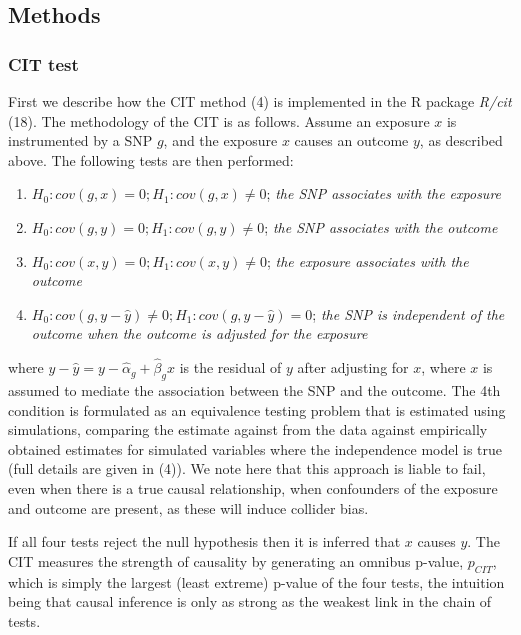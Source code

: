 \documentclass[]{article}
\providecommand{\tightlist}{%
  \setlength{\itemsep}{0pt}\setlength{\parskip}{0pt}}
\begin{document}
\subsection{Methods}\label{methods}

\subsubsection{CIT test}\label{cit-test}

First we describe how the CIT method (4) is implemented in the R package
\emph{R/cit} (18). The methodology of the CIT is as follows. Assume an
exposure \(x\) is instrumented by a SNP \(g\), and the exposure \(x\)
causes an outcome \(y\), as described above. The following tests are
then performed:

\begin{enumerate}
\def\labelenumi{\arabic{enumi}.}
\tightlist
\item
  \(H_0: cov(g, x) = 0; H_1: cov(g, x) \neq 0\); \emph{the SNP
  associates with the exposure}
\item
  \(H_0: cov(g, y) = 0; H_1: cov(g, y) \neq 0\); \emph{the SNP
  associates with the outcome}
\item
  \(H_0: cov(x, y) = 0; H_1: cov(x, y) \neq 0\); \emph{the exposure
  associates with the outcome}
\item
  \(H_0: cov(g, y - \hat{y}) \neq 0; H_1: cov(g, y - \hat{y}) = 0\);
  \emph{the SNP is independent of the outcome when the outcome is
  adjusted for the exposure}
\end{enumerate}

where \(y - \hat{y} = y - \hat{\alpha}_g + \hat{\beta}_g x\) is the
residual of \(y\) after adjusting for \(x\), where \(x\) is assumed to
mediate the association between the SNP and the outcome. The 4th
condition is formulated as an equivalence testing problem that is
estimated using simulations, comparing the estimate against from the
data against empirically obtained estimates for simulated variables
where the independence model is true (full details are given in (4)). We
note here that this approach is liable to fail, even when there is a
true causal relationship, when confounders of the exposure and outcome
are present, as these will induce collider bias.

If all four tests reject the null hypothesis then it is inferred that
\(x\) causes \(y\). The CIT measures the strength of causality by
generating an omnibus p-value, \(p_{CIT}\), which is simply the largest
(least extreme) p-value of the four tests, the intuition being that
causal inference is only as strong as the weakest link in the chain of
tests.
\end{document}
